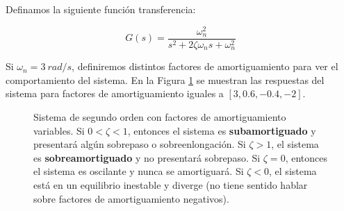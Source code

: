 Definamos la siguiente función transferencia:

\begin{equation}
    G(s) = \frac{\omega_n^2}{s^2 + 2\zeta\omega_ns + \omega_n^2}
\end{equation}


\noindent Si $\omega_n = \SI{3}{rad/s}$, definiremos distintos factores de amortiguamiento para ver el comportamiento del sistema. En la Figura \ref{fig:2} se muestran las respuestas del sistema para factores de amortiguamiento iguales a $[3, 0.6, -0.4, -2]$.

\begin{figure}[ht!]
    \centering
    \caption{Sistema de segundo orden con factores de amortiguamiento variables. Si $0< \zeta < 1$, entonces el sistema es \textbf{subamortiguado} y presentará algún sobrepaso o sobreenlongación. Si $\zeta > 1$, el sistema es \textbf{sobreamortiguado} y no presentará sobrepaso. Si $\zeta = 0$, entonces el sistema es oscilante y nunca se amortiguará. Si $\zeta < 0$, el sistema está en un equilibrio inestable y diverge (no tiene sentido hablar sobre factores de amortiguamiento negativos).}
    \label{fig:2}
\end{figure}


